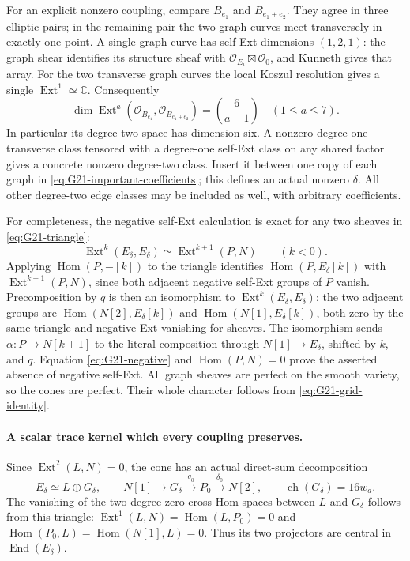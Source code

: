For an explicit nonzero coupling, compare
\(B_{e_1}\) and \(B_{e_1+e_2}\). They agree in three elliptic
pairs; in the remaining pair the two graph curves meet transversely
in exactly one point. A single graph curve has self-Ext dimensions
\((1,2,1)\): the graph shear identifies its structure sheaf with
\(\mathcal O_{E_i}\boxtimes\mathcal O_0\), and Kunneth gives
that array. For the two transverse graph curves the local Koszul
resolution gives a single \(\operatorname{Ext}^1\simeq\mathbb C\).
Consequently
\begin{equation}\label{eq:G21-edge-Ext}
 \dim\operatorname{Ext}^a(\mathcal O_{B_{e_1}},
                   \mathcal O_{B_{e_1+e_2}})
       =\binom6{a-1}\quad(1\le a\le7).
\end{equation}
In particular its degree-two space has dimension six. A nonzero
degree-one transverse class tensored with a degree-one self-Ext class
on any shared factor gives a concrete nonzero degree-two class.
Insert it between one copy of each graph in
\eqref{eq:G21-important-coefficients}; this defines an actual nonzero
\(\delta\). All other degree-two edge classes may be included as
well, with arbitrary coefficients.

For completeness, the negative self-Ext calculation is exact for
any two sheaves in \eqref{eq:G21-triangle}:
\begin{equation}\label{eq:G21-negative}
 \operatorname{Ext}^k(E_\delta,E_\delta)
          \simeq\operatorname{Ext}^{k+1}(P,N)\qquad(k<0).
\end{equation}
Applying \(\operatorname{Hom}(P,-[k])\) to the triangle identifies
\(\operatorname{Hom}(P,E_\delta[k])\) with
\(\operatorname{Ext}^{k+1}(P,N)\), since both adjacent negative
self-Ext groups of \(P\) vanish. Precomposition by \(q\) is then
an isomorphism to \(\operatorname{Ext}^k(E_\delta,E_\delta)\):
the two adjacent groups are
\(\operatorname{Hom}(N[2],E_\delta[k])\) and
\(\operatorname{Hom}(N[1],E_\delta[k])\), both zero by the same
triangle and negative Ext vanishing for sheaves. The isomorphism
sends \(\alpha:P\to N[k+1]\) to the literal composition through
\(N[1]\to E_\delta\), shifted by \(k\), and \(q\).
Equation \eqref{eq:G21-negative} and \(\operatorname{Hom}(P,N)=0\)
prove the asserted absence of negative self-Ext. All graph sheaves
are perfect on the smooth variety, so the cones are perfect.
Their whole character follows from \eqref{eq:G21-grid-identity}.

\paragraph{A scalar trace kernel which every coupling preserves.}
Since \(\operatorname{Ext}^2(L,N)=0\), the cone has an actual
direct-sum decomposition
\[
 E_\delta\simeq L\oplus G_\delta,
 \qquad N[1]\longrightarrow G_\delta\xrightarrow{q_0}P_0
                     \xrightarrow{\delta_0}N[2],
 \qquad \operatorname{ch}(G_\delta)=16w_d.
\]
The vanishing of the two degree-zero cross Hom spaces between
\(L\) and \(G_\delta\) follows from this triangle:
\(\operatorname{Ext}^1(L,N)=\operatorname{Hom}(L,P_0)=0\)
and \(\operatorname{Hom}(P_0,L)
=\operatorname{Hom}(N[1],L)=0\). Thus its two projectors are
central in \(\operatorname{End}(E_\delta)\).

